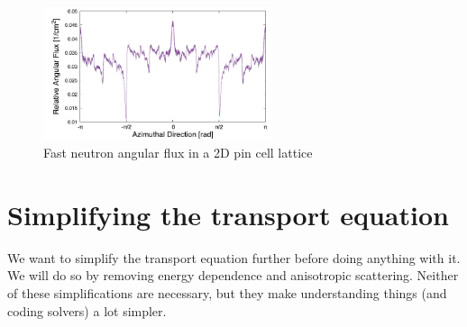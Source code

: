 \documentclass{article}
\begin{document}
\begin{figure}[h]
        \centering
        \includegraphics[width=0.6\textwidth]{angular_flux.png}
        \caption{Fast neutron angular flux in a 2D pin cell lattice~\cite{Tramm2017}}
        \label{fig:angular_flux}
\end{figure}

\section{Simplifying the transport equation}

We want to simplify the transport equation further before doing anything with it. We will do so by removing energy dependence and anisotropic scattering. Neither of these simplifications are necessary, but they make understanding things (and coding solvers) a lot simpler.
\end{document}
